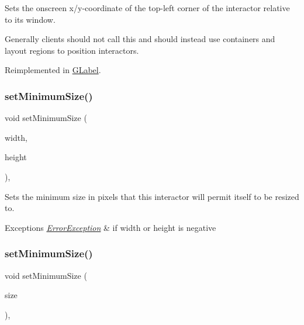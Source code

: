 Sets the onscreen x/y-\/coordinate of the top-\/left corner of the interactor relative to its window. 

Generally clients should not call this and should instead use containers and layout regions to position interactors. 

Reimplemented in \mbox{\hyperlink{classGLabel_a40e39a7bf1b0b46b3a5710bb9a0d214b}{G\+Label}}.

\mbox{\label{classGInteractor_a0cf428e207b7f22cc08138a90b1b87b2}} 
\subsubsection{\texorpdfstring{set\+Minimum\+Size()}{setMinimumSize()}\hspace{0.1cm}{\footnotesize\ttfamily [1/2]}}
{\footnotesize\ttfamily void set\+Minimum\+Size (\begin{DoxyParamCaption}\item[{double}]{width,  }\item[{double}]{height }\end{DoxyParamCaption})\hspace{0.3cm}{\ttfamily [virtual]}, {\ttfamily [inherited]}}



Sets the minimum size in pixels that this interactor will permit itself to be resized to. 


\begin{DoxyExceptions}{Exceptions}
{\em \mbox{\hyperlink{classErrorException}{Error\+Exception}}} & if width or height is negative \\
\hline
\end{DoxyExceptions}
\mbox{\label{classGInteractor_a3b1046117ac6cb7abe467e00ba8a81f4}} 
\subsubsection{\texorpdfstring{set\+Minimum\+Size()}{setMinimumSize()}\hspace{0.1cm}{\footnotesize\ttfamily [2/2]}}
{\footnotesize\ttfamily void set\+Minimum\+Size (\begin{DoxyParamCaption}\item[{const \mbox{\hyperlink{classGDimension}{G\+Dimension}} \&}]{size }\end{DoxyParamCaption})\hspace{0.3cm}{\ttfamily [virtual]}, {\ttfamily [inherited]}}



